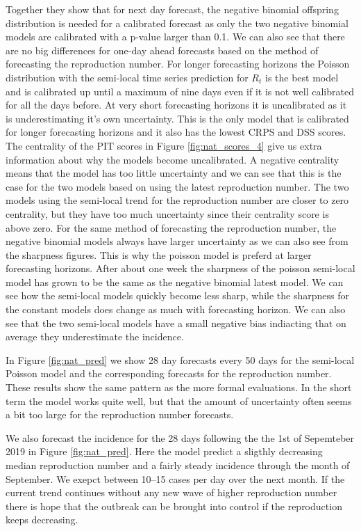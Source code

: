 \documentclass[12pt]{article}
\begin{document}
Together they show that for next day forecast, the negative binomial offspring distribution is needed for a calibrated forecast as only the two negative binomial models are calibrated with a p-value larger than 0.1. We can also see that there are no big differences for one-day ahead forecasts based on the method of forecasting the reproduction number. For longer forecasting horizons the Poisson distribution with the semi-local time series prediction for $R_t$ is the best model and is calibrated up until a maximum of nine days even if it is not well calibrated for all the days before. At very short forecasting horizons it is uncalibrated as it is underestimating it's own uncertainty. This is the only model that is calibrated for longer forecasting horizons and it also has the lowest CRPS and DSS scores. The centrality of the PIT scores in Figure \ref{fig:nat_scores_4} give us extra information about why the models become uncalibrated. A negative centrality means that the model has too little uncertainty and we can see that this is the case for the two models based on using the latest reproduction number. The two models using the semi-local trend for the reproduction number are closer to zero centrality, but they have too much uncertainty since their centrality score is above zero. For the same method of forecasting the reproduction number, the negative binomial models always have larger uncertainty as we can also see from the sharpness figures. This is why the poisson model is preferd at larger forecasting horizons. After about one week the sharpness of the poisson semi-local model has grown to be the same as the negative binomial latest model. We can see how the semi-local models quickly become less sharp, while the sharpness for the constant models does change as much with forecasting horizon.  We can also see that the two semi-local models have a small negative bias indiacting that on average they underestimate the incidence.

In Figure \ref{fig:nat_pred} we show 28 day forecasts every 50 days for the semi-local Poisson model and the corresponding forecasts for the reproduction number. These results show the same pattern as the more formal evaluations. In the short term the model works quite well, but that the amount of uncertainty often seems a bit too large for the reproduction number forecasts. 

We also forecast the incidence for the 28 days following the the 1st of Sepemteber 2019 in 
Figure \ref{fig:nat_pred}. Here the model predict a sligthly decreasing median reproduction number and a fairly steady incidence through the month of September. We exepct between 10--15 cases per day over the next month. If the current trend continues without any new wave of higher reproduction number there is hope that the outbreak can be brought into control if the reproduction keeps decreasing. 
\end{document}
